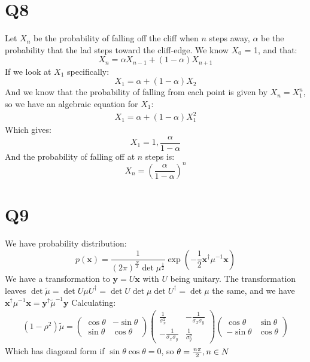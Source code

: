 \documentclass[12pt]{article}
\begin{document}
\section*{Q8}
Let $X_n$ be the probability of falling off the cliff when $n$ steps away, $\alpha$ be the probability that the lad steps toward the cliff-edge. We know $X_0$ = 1, and that:
\begin{equation}
	X_n=\alpha X_{n-1} + (1-\alpha) X_{n+1}
\end{equation}
If we look at $X_1$ specifically:
\begin{equation}
		X_1=\alpha+(1-\alpha)X_2
\end{equation}
And we know that the probability of falling from each point is given by $X_n=X_1^{n}$, so we have an algebraic equation for $X_1$:
\begin{align}
	X_1=\alpha+(1-\alpha)X_1^2
\end{align}
Which gives:
\begin{equation}
	X_1=1,\frac{\alpha}{1-\alpha}
\end{equation}
And the probability of falling off at $n$ steps is:
\begin{equation}
	X_n = \left(\frac{\alpha}{1-\alpha}\right)^n
\end{equation}
\section*{Q9}
We have probability distribution:
\begin{equation}
	p(\mathbf{x}) = \frac{1}{(2\pi)^{\frac{N}{2}}\det{\mu}^{\frac{1}{2}}}\exp{\left(-\frac{1}{2}\mathbf{x}^\dag\mu^{-1}\mathbf{x}\right)}
\end{equation}
We have a transformation to $\mathbf{y}=U\mathbf{x}$ with $U$ being unitary. The transformation leaves $\det{\tilde\mu}=\det{U\mu U^\dag}=\det{U}\det{\mu}\det{U^\dag}=\det{\mu}$ the same, and we have $\mathbf{x^\dag}\mu^{-1}\mathbf{x}=\mathbf{y^\dag}\tilde\mu^{-1}\mathbf{y}$
Calculating:
\begin{align}
(1-\rho^2)\tilde\mu = \left(\begin{matrix}\cos\theta & -\sin\theta \\ \sin\theta & \cos\theta\end{matrix}\right) 
\left(\begin{matrix}\frac{1}{\sigma_x^2} & -\frac{1}{\sigma_x\sigma_y} \\ - \frac{1}{\sigma_x\sigma_y} & \frac{1}{\sigma_y^2}\end{matrix} \right)
\left( \begin{matrix}\cos\theta & \sin\theta \\ -\sin\theta & \cos\theta\end{matrix}\right)
\end{align}
Which has diagonal form if $\sin\theta\cos\theta=0$, so $\theta=\frac{n\pi}{2}, n\in\mathcal \mathbb{N}$
\end{document}
